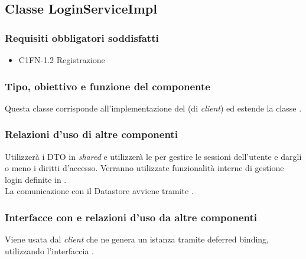 \subsection{Classe LoginServiceImpl}
\subsubsection*{Requisiti obbligatori soddisfatti}
\begin{itemize}
	\item C1FN-1.2 Registrazione
\end{itemize}
\subsubsection*{Tipo, obiettivo e funzione del componente}
Questa classe corrisponde all'implementazione del  (di
\emph{client}) ed estende la classe .
\subsubsection*{Relazioni d'uso di altre componenti}
Utilizzer\`a i DTO in \emph{shared} e utilizzer\`a le  per
gestire le sessioni dell'utente e dargli o meno i diritti d'accesso.
Verranno utilizzate funzionalit\`a interne di gestione login definite in
. \\
La comunicazione con il Datastore avviene tramite .
\subsubsection*{Interfacce con e relazioni d'uso da altre componenti}
Viene usata dal \emph{client} che ne genera un istanza tramite deferred binding,
utilizzando l'interfaccia .
